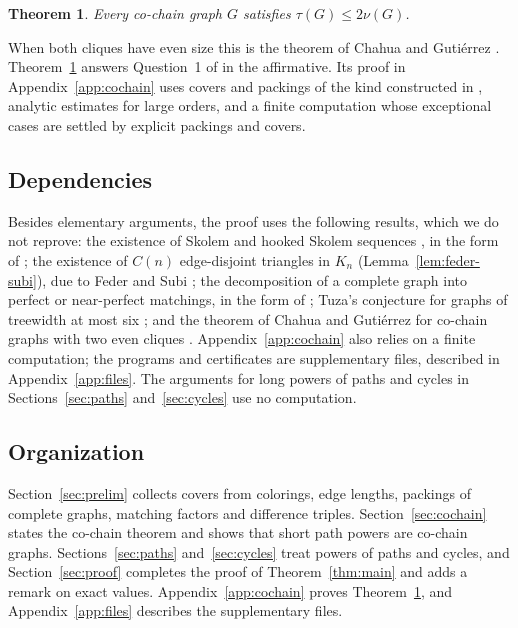 \documentclass{amsart}
\newtheorem{theorem}{Theorem}[section]
\theoremstyle{definition}
\theoremstyle{remark}
\numberwithin{equation}{section}
\numberwithin{table}{section}
\begin{document}
\begin{theorem}\label{thm:cochain-intro}
Every co-chain graph $G$ satisfies $\tau(G)\le2\nu(G)$.
\end{theorem}

When both cliques have even size this is the theorem of Chahua and Guti\'errez \cite[Theorem~1]{CG}. Theorem~\ref{thm:cochain-intro} answers Question~1 of \cite{CG} in the affirmative. Its proof in Appendix~\ref{app:cochain} uses covers and packings of the kind constructed in \cite{BBGHMNO,CG}, analytic estimates for large orders, and a finite computation whose exceptional cases are settled by explicit packings and covers.

\subsection*{Dependencies}
Besides elementary arguments, the proof uses the following results, which we do not reprove: the existence of Skolem and hooked Skolem sequences \cite{Skolem,OKeefe}, in the form of \cite[Theorem~5.3]{BBW}; the existence of $C(n)$ edge-disjoint triangles in $K_n$ (Lemma~\ref{lem:feder-subi}), due to Feder and Subi \cite[Theorem~2]{FederSubi}; the decomposition of a complete graph into perfect or near-perfect matchings, in the form of \cite[Lemma~3]{BBGHMNO}; Tuza's conjecture for graphs of treewidth at most six \cite[Theorem~3.4]{BFG}; and the theorem of Chahua and Guti\'errez for co-chain graphs with two even cliques \cite[Theorem~1]{CG}. Appendix~\ref{app:cochain} also relies on a finite computation; the programs and certificates are supplementary files, described in Appendix~\ref{app:files}. The arguments for long powers of paths and cycles in Sections~\ref{sec:paths} and~\ref{sec:cycles} use no computation.

\subsection*{Organization}
Section~\ref{sec:prelim} collects covers from colorings, edge lengths, packings of complete graphs, matching factors and difference triples. Section~\ref{sec:cochain} states the co-chain theorem and shows that short path powers are co-chain graphs. Sections~\ref{sec:paths} and~\ref{sec:cycles} treat powers of paths and cycles, and Section~\ref{sec:proof} completes the proof of Theorem~\ref{thm:main} and adds a remark on exact values. Appendix~\ref{app:cochain} proves Theorem~\ref{thm:cochain-intro}, and Appendix~\ref{app:files} describes the supplementary files.
\end{document}
